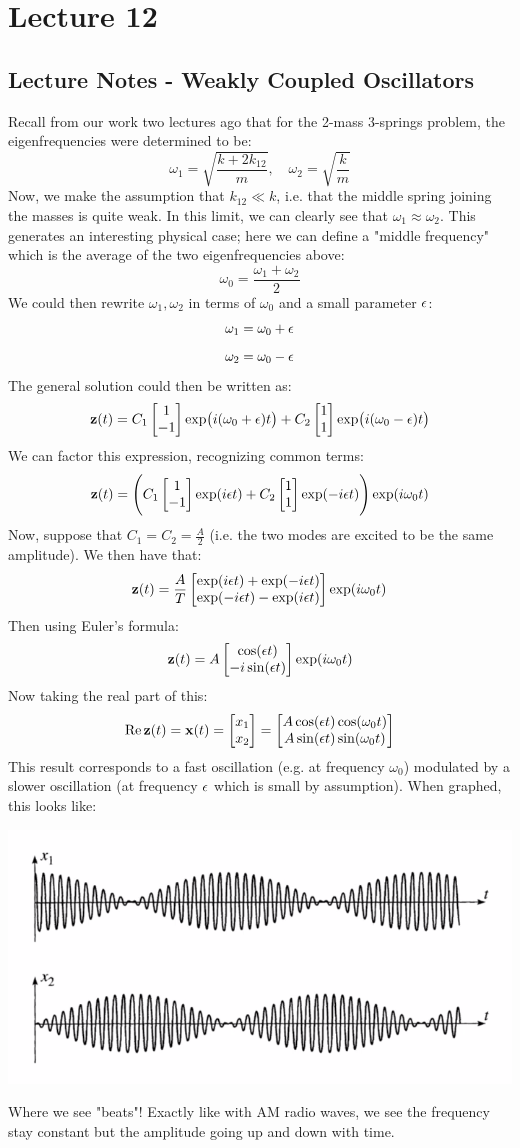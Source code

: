 \documentclass[../PHYS306Notes.tex]{subfiles}
\begin{document}
\section{Lecture 12}
\subsection{Lecture Notes - Weakly Coupled Oscillators}
Recall from our work two lectures ago that for the 2-mass 3-springs problem, the eigenfrequencies were determined to be:
\[\omega_1 = \sqrt{\frac{k+2k_{12}}{m}}, \quad \omega_2 = \sqrt{\frac{k}{m}}\]
Now, we make the assumption that $k_{12} \ll k$, i.e. that the middle spring joining the masses is quite weak. In this limit, we can clearly see that $\omega_1 \approx \omega_2$. This generates an interesting physical case; here we can define a "middle frequency" which is the average of the two eigenfrequencies above:
\[\omega_0 = \frac{\omega_1 + \omega_2}{2}\]
We could then rewrite $\omega_1, \omega_2$ in terms of $\omega_0$ and a small parameter $\epsilon$:
\[\omega_1 = \omega_0 + \epsilon\]
\[\omega_2 = \omega_0 - \epsilon\]
The general solution could then be written as:
\[\mathbf{z}(t) = C_1\begin{bmatrix}1 \\ -1\end{bmatrix}\exp(i(\omega_0 + \epsilon)t) + C_2\begin{bmatrix}1\\1\end{bmatrix}\exp(i(\omega_0 - \epsilon)t)\]
We can factor this expression, recognizing common terms:
\[\mathbf{z}(t) = \left(C_1\begin{bmatrix}1 \\ -1\end{bmatrix}\exp(i\epsilon t) + C_2\begin{bmatrix}1\\1\end{bmatrix}\exp(-i\epsilon t)\right)\exp(i\omega_0 t)\]
Now, suppose that $C_1 = C_2 = \frac{A}{2}$ (i.e. the two modes are excited to be the same amplitude). We then have that:
\[\mathbf{z}(t) = \frac{A}{T}\begin{bmatrix}\exp(i\epsilon t) + \exp(-i\epsilon t) \\ \exp(-i\epsilon t) - \exp(i \epsilon t)\end{bmatrix}\exp(i\omega_0 t)\]
Then using Euler's formula:
\[\mathbf{z}(t) = A\begin{bmatrix}\cos(\epsilon t) \\ -i\sin(\epsilon t)\end{bmatrix}\exp(i\omega_0 t)\]
Now taking the real part of this:
\[\Re\mathbf{z}(t) = \mathbf{x}(t) = \begin{bmatrix}x_1 \\ x_2\end{bmatrix} = \begin{bmatrix}A\cos(\epsilon t)\cos(\omega_0 t) \\ A\sin(\epsilon t)\sin(\omega_0 t)\end{bmatrix}\]
This result corresponds to a fast oscillation (e.g. at frequency $\omega_0$) modulated by a slower oscillation (at frequency $\epsilon$ which is small by assumption). When graphed, this looks like:
\begin{center}
    \includegraphics[scale=0.5]{Lecture-12/l12-img1.png}
\end{center}
Where we see "beats"! Exactly like with AM radio waves, we see the frequency stay constant but the amplitude going up and down with time.
\end{document}
